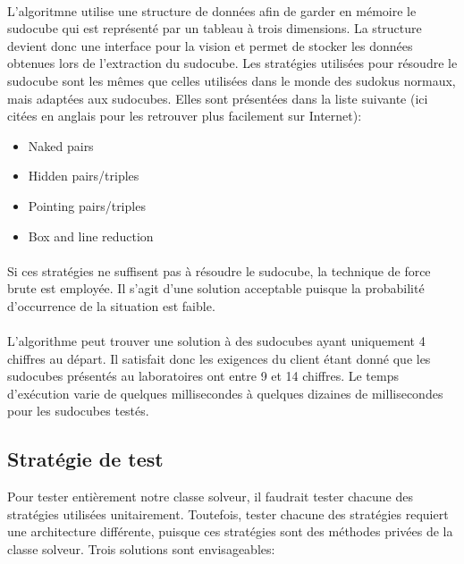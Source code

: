 \paragraph{}L'algoritmne utilise une structure de données afin de garder en mémoire le sudocube qui est représenté par un tableau à trois dimensions. La structure devient donc une interface pour la vision et permet de stocker les données obtenues lors de l'extraction du sudocube.
Les stratégies utilisées pour résoudre le sudocube sont les mêmes que celles  utilisées dans le monde des sudokus normaux, mais adaptées aux sudocubes. Elles sont présentées dans la liste suivante (ici citées en anglais pour les retrouver plus facilement sur Internet):\newline
\begin{itemize}
\item Naked pairs
\item Hidden pairs/triples
\item Pointing pairs/triples
\item Box and line reduction
\end{itemize}
\paragraph{}Si ces stratégies ne suffisent pas à résoudre le sudocube, la technique de force brute est employée. Il s'agit d'une solution acceptable puisque la probabilité d’occurrence de la situation est faible.

\paragraph{}L'algorithme peut trouver une solution à des sudocubes ayant uniquement 4 chiffres au départ. Il satisfait donc les exigences du client étant donné que les sudocubes présentés au laboratoires ont entre 9 et 14 chiffres. Le temps d'exécution varie de quelques millisecondes à quelques dizaines de millisecondes pour les sudocubes testés.

\subsection{Stratégie de test}
Pour tester entièrement notre classe solveur, il faudrait tester chacune des stratégies utilisées unitairement. Toutefois, tester chacune des stratégies requiert une architecture différente, puisque ces stratégies sont des méthodes privées de la classe solveur. Trois solutions sont envisageables:

